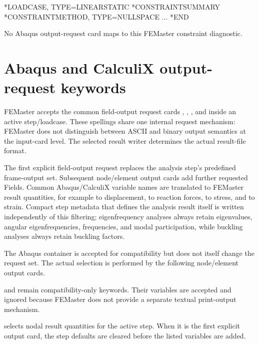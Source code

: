 \exampleheading
\begin{dialectexamples}
\begin{femasterdeck}
*LOADCASE, TYPE=LINEARSTATIC
*CONSTRAINTSUMMARY
*CONSTRAINTMETHOD, TYPE=NULLSPACE
...
*END
\end{femasterdeck}
\begin{noabaqus}
No Abaqus output-request card maps to this FEMaster constraint diagnostic.
\end{noabaqus}
\end{dialectexamples}

\section{Abaqus and CalculiX output-request keywords}

FEMaster accepts the common field-output request cards , , , and  inside an active step/loadcase. These spellings share one internal request mechanism: FEMaster does not distinguish between ASCII and binary output semantics at the input-card level. The selected result writer determines the actual result-file format.

The first explicit field-output request replaces the analysis step's predefined frame-output set. Subsequent node/element output cards add further requested Fields. Common Abaqus/CalculiX variable names are translated to FEMaster result quantities, for example  to displacement,  to reaction forces,  to stress, and  to strain. Compact step metadata that defines the analysis result itself is written independently of this filtering; eigenfrequency analyses always retain eigenvalues, angular eigenfrequencies, frequencies, and modal participation, while buckling analyses always retain buckling factors.

The Abaqus container  is accepted for compatibility but does not itself change the request set. The actual selection is performed by the following node/element output cards.

 and  remain compatibility-only keywords. Their variables are accepted and ignored because FEMaster does not provide a separate textual print-output mechanism.


 selects nodal result quantities for the active step. When it is the first explicit output card, the step defaults are cleared before the listed variables are added.


